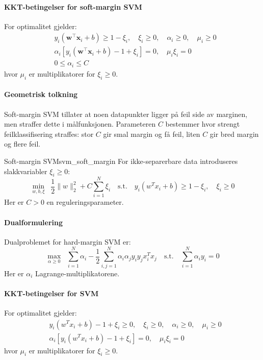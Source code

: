\paragraph{KKT-betingelser for soft-margin SVM}
For optimalitet gjelder:
\begin{align*}
	 & y_i(\symbf{w}^\top \symbf{x}_i + b) \ge 1 - \xi_i,\quad \xi_i \ge 0,\quad \alpha_i \ge 0,\quad \mu_i \ge 0 \\
	 & \alpha_i [y_i(\symbf{w}^\top \symbf{x}_i + b) - 1 + \xi_i] = 0,\quad \mu_i \xi_i = 0                       \\
	 & 0 \leq \alpha_i \leq C
\end{align*}
hvor $\mu_i$ er multiplikatorer for $\xi_i \ge 0$.


\paragraph{Geometrisk tolkning}
Soft-margin SVM tillater at noen datapunkter ligger på feil side av marginen, men straffer dette i målfunksjonen. Parameteren $C$ bestemmer hvor strengt feilklassifisering straffes: stor $C$ gir smal margin og få feil, liten $C$ gir bred margin og flere feil.

\begin{definition}{Soft-margin SVM}{svm_soft_margin}
	For ikke-separerbare data introduseres slakkvariabler $\xi_i \ge 0$:
	\[
		\min_{w, b, \xi} \;\; \frac{1}{2}\|w\|_2^2 + C\sum_{i=1}^N \xi_i
		\quad\text{s.t.}\quad
		y_i(w^T x_i + b) \ge 1 - \xi_i,\quad \xi_i \ge 0
	\]
	Her er $C > 0$ en reguleringsparameter.
\end{definition}

\paragraph{Dualformulering}
Dualproblemet for hard-margin SVM er:
\[
	\max_{\alpha \ge 0} \;\; \sum_{i=1}^N \alpha_i - \frac{1}{2}\sum_{i,j=1}^N \alpha_i \alpha_j y_i y_j x_i^T x_j
	\quad\text{s.t.}\quad
	\sum_{i=1}^N \alpha_i y_i = 0
\]
Her er $\alpha_i$ Lagrange-multiplikatorene.

\paragraph{KKT-betingelser for SVM}
For optimalitet gjelder:
\begin{align*}
	 & y_i(w^T x_i + b) - 1 + \xi_i \ge 0,\quad \xi_i \ge 0,\quad \alpha_i \ge 0,\quad \mu_i \ge 0 \\
	 & \alpha_i [y_i(w^T x_i + b) - 1 + \xi_i] = 0,\quad \mu_i \xi_i = 0
\end{align*}
hvor $\mu_i$ er multiplikatorer for $\xi_i \ge 0$.

